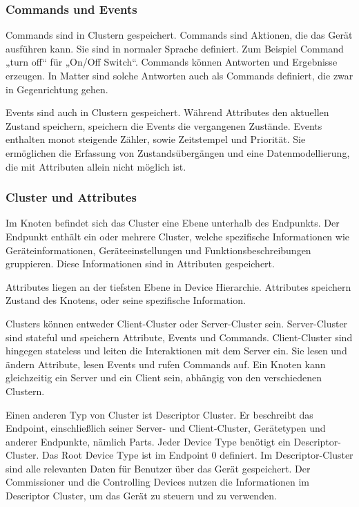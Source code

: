 \documentclass[12pt, a4paper]{article}
\begin{document}
\subsubsection{Commands und Events}
\par Commands sind in Clustern gespeichert. Commands sind Aktionen, die das Gerät ausführen kann. Sie sind in normaler Sprache definiert. Zum Beispiel Command „turn off“ für „On/Off Switch“. Commands können Antworten und Ergebnisse erzeugen. In Matter sind solche Antworten auch als Commands definiert, die zwar in Gegenrichtung gehen.
\par Events sind auch in Clustern gespeichert. Während Attributes den aktuellen Zustand speichern, speichern die Events die vergangenen Zustände. Events enthalten monot steigende Zähler, sowie Zeitstempel und Priorität. Sie ermöglichen die Erfassung von Zustandsübergängen und eine Datenmodellierung, die mit Attributen allein nicht möglich ist.
\subsubsection{Cluster und Attributes}
\par Im Knoten befindet sich das Cluster eine Ebene unterhalb des Endpunkts. Der Endpunkt enthält ein oder mehrere Cluster, welche spezifische Informationen wie Geräteinformationen, Geräteeinstellungen und Funktionsbeschreibungen gruppieren. Diese Informationen sind in Attributen gespeichert.
\par Attributes liegen an der tiefsten Ebene in Device Hierarchie. Attributes speichern Zustand des Knotens, oder seine spezifische Information. 
\par Clusters können entweder Client-Cluster oder Server-Cluster sein. Server-Cluster sind stateful und speichern Attribute, Events und Commands. Client-Cluster sind hingegen stateless und leiten die Interaktionen mit dem Server ein. Sie lesen und ändern Attribute, lesen Events und rufen Commands auf. Ein Knoten kann gleichzeitig ein Server und ein Client sein, abhängig von den verschiedenen Clustern.
\par Einen anderen Typ von Cluster ist Descriptor Cluster.   Er beschreibt das Endpoint, einschließlich seiner Server- und Client-Cluster, Gerätetypen und anderer Endpunkte, nämlich Parts. Jeder Device Type benötigt ein Descriptor-Cluster. Das Root Device Type ist im Endpoint 0 definiert. Im Descriptor-Cluster sind alle relevanten Daten für Benutzer über das Gerät gespeichert. Der Commissioner und die Controlling Devices nutzen die Informationen im Descriptor Cluster, um das Gerät zu steuern und zu verwenden.
\end{document}
